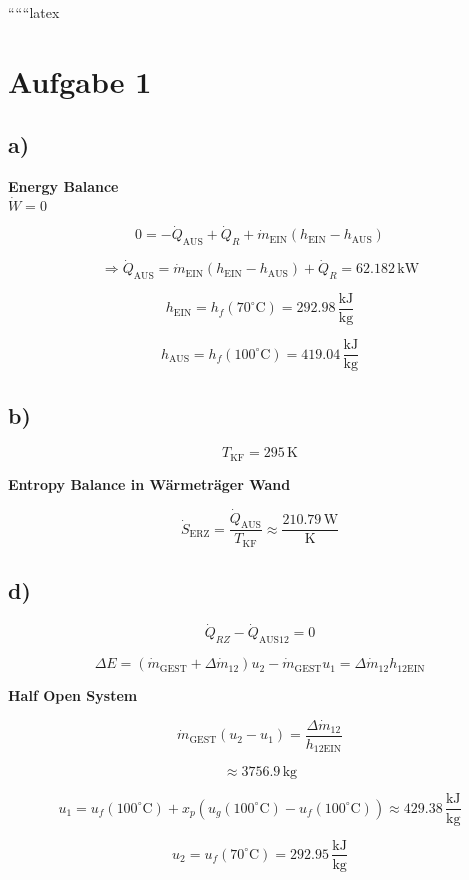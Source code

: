 
``````latex


\section*{Aufgabe 1}

\subsection*{a)}
\textbf{Energy Balance} \\
$\dot{W} = 0$

\[
0 = -\dot{Q}_{\text{AUS}} + \dot{Q}_R + \dot{m}_{\text{EIN}} \left( h_{\text{EIN}} - h_{\text{AUS}} \right)
\]

\[
\Rightarrow \dot{Q}_{\text{AUS}} = \dot{m}_{\text{EIN}} \left( h_{\text{EIN}} - h_{\text{AUS}} \right) + \dot{Q}_R = 62.182 \, \text{kW}
\]

\[
h_{\text{EIN}} = h_f(70^\circ \text{C}) = 292.98 \, \frac{\text{kJ}}{\text{kg}}
\]

\[
h_{\text{AUS}} = h_f(100^\circ \text{C}) = 419.04 \, \frac{\text{kJ}}{\text{kg}}
\]

\subsection*{b)}
\[
T_{\text{KF}} = 295 \, \text{K}
\]

\textbf{Entropy Balance in Wärmeträger Wand}

\[
\dot{S}_{\text{ERZ}} = \frac{\dot{Q}_{\text{AUS}}}{T_{\text{KF}}} \approx \frac{210.79 \, \text{W}}{\text{K}}
\]

\subsection*{d)}
\[
\dot{Q}_{RZ} - \dot{Q}_{\text{AUS12}} = 0
\]

\[
\Delta E = \left( \dot{m}_{\text{GEST}} + \Delta \dot{m}_{12} \right) u_2 - \dot{m}_{\text{GEST}} u_1 = \Delta \dot{m}_{12} h_{\text{12EIN}}
\]

\textbf{Half Open System}

\[
\dot{m}_{\text{GEST}} (u_2 - u_1) = \frac{\Delta \dot{m}_{12}}{h_{\text{12EIN}}}
\]

\[
\approx 3756.9 \, \text{kg}
\]

\[
u_1 = u_f(100^\circ \text{C}) + x_p \left( u_g(100^\circ \text{C}) - u_f(100^\circ \text{C}) \right) \approx 429.38 \, \frac{\text{kJ}}{\text{kg}}
\]

\[
u_2 = u_f(70^\circ \text{C}) = 292.95 \, \frac{\text{kJ}}{\text{kg}}
\]

